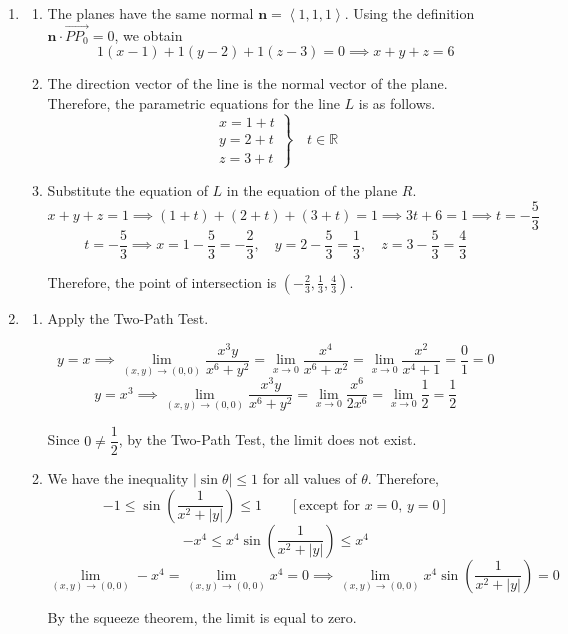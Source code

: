 \documentclass[a4paper, 12pt]{article}
\begin{document}
\begin{enumerate}[leftmargin=*,label=\textbf{\arabic*.}]
\item \begin{enumerate}[leftmargin=*,label=\textbf{\alph*.}]
\item The planes have the same normal $\mathbf n=\left\langle1,1,1\right\rangle$. Using the definition $\mathbf n\cdot\overrightarrow{PP_0}=0$, we obtain
\[1(x-1)+1(y-2)+1(z-3)=0\implies\boxed{x+y+z=6}\]

\item The direction vector of the line is the normal vector of the plane. Therefore, the parametric equations for the line $L$ is as follows.
\[\boxed{\left.\begin{array}{l}
x=1+t\\
y=2+t\\
z=3+t
\end{array}\right\}\quad t\in\mathbb{R}}\]

\item Substitute the equation of $L$ in the equation of the plane $R$.
\[x+y+z=1\implies (1+t)+(2+t)+(3+t)=1\implies 3t+6=1\implies t=-\frac53\]
\[t=-\frac53\implies x=1-\frac53=-\frac23,\quad y=2-\frac53=\frac13,\quad z=3-\frac53=\frac43\]

Therefore, the point of intersection is $\boxed{\left(-\frac23,\frac13,\frac43\right)}$.
\end{enumerate}

\item \begin{enumerate}[leftmargin=*,label=\textbf{\alph*.}]
\item Apply the Two-Path Test.

\[y=x\implies\lim_{(x,y)\to(0,0)}\frac{x^3y}{x^6+y^2}=\lim_{x\to0}\frac{x^4}{x^6+x^2}=\lim_{x\to0}\frac{x^2}{x^4+1}=\frac01=0\]
\[y=x^3\implies\lim_{(x,y)\to(0,0)}\frac{x^3y}{x^6+y^2}=\lim_{x\to0}\frac{x^6}{2x^6}=\lim_{x\to0}\frac12=\frac12\]

Since $0\neq\dfrac12$, by the Two-Path Test, the limit does not exist.

\item We have the inequality $\left|\sin\theta\right|\leq1$ for all values of $\theta$. Therefore,
\[-1\leq\sin\left(\frac1{x^2+|y|}\right)\leq1\qquad\left[\text{except for }x=0,\,y=0\right]\]
\[-x^4\leq x^4\sin\left(\frac1{x^2+|y|}\right)\leq x^4\]
\[\lim_{(x,y)\to(0,0)}-x^4=\lim_{(x,y)\to(0,0)}x^4=0\implies\lim_{(x,y)\to(0,0)}x^4\sin\left(\frac1{x^2+|y|}\right)=\boxed0\]

By the squeeze theorem, the limit is equal to zero.


\end{enumerate}
\end{enumerate}
\end{document}
